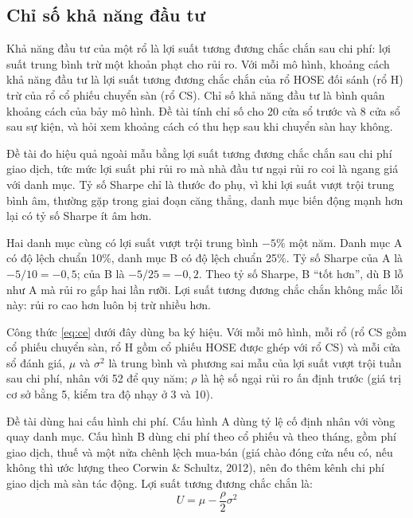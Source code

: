 \subsection{Chỉ số khả năng đầu tư}\label{sec:khanangdautu}

\begin{tomtat}
Khả năng đầu tư của một rổ là lợi suất tương đương chắc chắn sau chi phí: lợi suất trung bình trừ một khoản phạt cho rủi ro. Với mỗi mô hình, khoảng cách khả năng đầu tư là lợi suất tương đương chắc chắn của rổ HOSE đối sánh (rổ H) trừ của rổ cổ phiếu chuyển sàn (rổ CS). Chỉ số khả năng đầu tư là bình quân khoảng cách của bảy mô hình. Đề tài tính chỉ số cho 20 cửa sổ trước và 8 cửa sổ sau sự kiện, và hỏi xem khoảng cách có thu hẹp sau khi chuyển sàn hay không.
\end{tomtat}

Đề tài đo hiệu quả ngoài mẫu bằng lợi suất tương đương chắc chắn sau chi phí giao dịch, tức mức lợi suất phi rủi ro mà nhà đầu tư ngại rủi ro coi là ngang giá với danh mục. Tỷ số Sharpe chỉ là thước đo phụ, vì khi lợi suất vượt trội trung bình âm, thường gặp trong giai đoạn căng thẳng, danh mục biến động mạnh hơn lại có tỷ số Sharpe ít âm hơn.

\begin{vidu}
Hai danh mục cùng có lợi suất vượt trội trung bình $-5\%$ một năm. Danh mục A có độ lệch chuẩn 10\%, danh mục B có độ lệch chuẩn 25\%. Tỷ số Sharpe của A là $-5/10 = -0{,}5$; của B là $-5/25 = -0{,}2$. Theo tỷ số Sharpe, B \enquote{tốt hơn}, dù B lỗ như A mà rủi ro gấp hai lần rưỡi. Lợi suất tương đương chắc chắn không mắc lỗi này: rủi ro cao hơn luôn bị trừ nhiều hơn.
\end{vidu}

Công thức \eqref{eq:ce} dưới đây dùng ba ký hiệu. Với mỗi mô hình, mỗi rổ (rổ CS gồm cổ phiếu chuyển sàn, rổ H gồm cổ phiếu HOSE được ghép với rổ CS) và mỗi cửa sổ đánh giá, $\mu$ và $\sigma^2$ là trung bình và phương sai mẫu của lợi suất vượt trội tuần sau chi phí, nhân với 52 để quy năm; $\rho$ là hệ số ngại rủi ro ấn định trước (giá trị cơ sở bằng 5, kiểm tra độ nhạy ở 3 và 10).

Đề tài dùng hai cấu hình chi phí. Cấu hình A dùng tỷ lệ cố định nhân với vòng quay danh mục. Cấu hình B dùng chi phí theo cổ phiếu và theo tháng, gồm phí giao dịch, thuế và một nửa chênh lệch mua-bán (giá chào đóng cửa nếu có, nếu không thì ước lượng theo Corwin \& Schultz, 2012), nên đo thêm kênh chi phí giao dịch mà sàn tác động. Lợi suất tương đương chắc chắn là:
\begin{equation}\label{eq:ce}
U = \mu - \frac{\rho}{2}\sigma^2
\end{equation}

